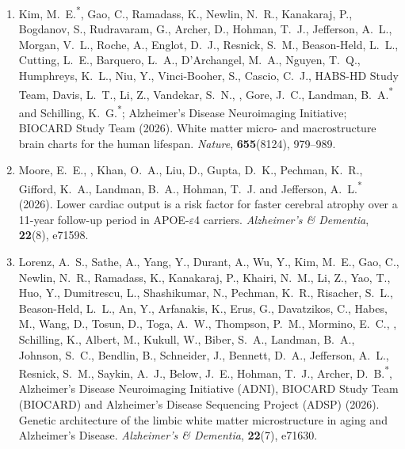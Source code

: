 \begin{enumerate}[resume=journalpubs]
\begin{pubentry}
\par\end{pubentry}
\item\begin{pubentry} Kim, M.\ E.\textsuperscript{*}, Gao, C., Ramadass, K., Newlin, N.\ R., Kanakaraj, P., Bogdanov, S., Rudravaram, G., Archer, D., Hohman, T.\ J., Jefferson, A.\ L., Morgan, V.\ L., Roche, A., Englot, D.\ J., Resnick, S.\ M., Beason-Held, L.\ L., Cutting, L.\ E., Barquero, L.\ A., D'Archangel, M.\ A., Nguyen, T.\ Q., Humphreys, K.\ L., Niu, Y., Vinci-Booher, S., Cascio, C.\ J., HABS-HD Study Team, Davis, L.\ T., Li, Z., Vandekar, S.\ N., \PZnot{}, Gore, J.\ C., Landman, B.\ A.\textsuperscript{*} and Schilling, K.\ G.\textsuperscript{*}; Alzheimer's Disease Neuroimaging Initiative; BIOCARD Study Team (2026). White matter micro- and macrostructure brain charts for the human lifespan. \emph{Nature}, \textbf{655}(8124), 979--989.

\par\end{pubentry}
\item\begin{pubentry} Moore, E.\ E., \PZnot{}, Khan, O.\ A., Liu, D., Gupta, D.\ K., Pechman, K.\ R., Gifford, K.\ A., Landman, B.\ A., Hohman, T.\ J. and Jefferson, A.\ L.\textsuperscript{*} (2026). Lower cardiac output is a risk factor for faster cerebral atrophy over a 11-year follow-up period in APOE-$\varepsilon$4 carriers. \emph{Alzheimer's \& Dementia}, \textbf{22}(8), e71598.

\par\end{pubentry}
\item\begin{pubentry} Lorenz, A.\ S., Sathe, A., Yang, Y., Durant, A., Wu, Y., Kim, M.\ E., Gao, C., Newlin, N.\ R., Ramadass, K., Kanakaraj, P., Khairi, N.\ M., Li, Z., Yao, T., Huo, Y., Dumitrescu, L., Shashikumar, N., Pechman, K.\ R., Risacher, S.\ L., Beason-Held, L.\ L., An, Y., Arfanakis, K., Erus, G., Davatzikos, C., Habes, M., Wang, D., Tosun, D., Toga, A.\ W., Thompson, P.\ M., Mormino, E.\ C., \PZnot{}, Schilling, K., Albert, M., Kukull, W., Biber, S.\ A., Landman, B.\ A., Johnson, S.\ C., Bendlin, B., Schneider, J., Bennett, D.\ A., Jefferson, A.\ L., Resnick, S.\ M., Saykin, A.\ J., Below, J.\ E., Hohman, T.\ J., Archer, D.\ B.\textsuperscript{*}, Alzheimer's Disease Neuroimaging Initiative (ADNI), BIOCARD Study Team (BIOCARD) and Alzheimer's Disease Sequencing Project (ADSP) (2026). Genetic architecture of the limbic white matter microstructure in aging and Alzheimer's Disease. \emph{Alzheimer's \& Dementia}, \textbf{22}(7), e71630.


\end{pubentry}
\end{enumerate}

